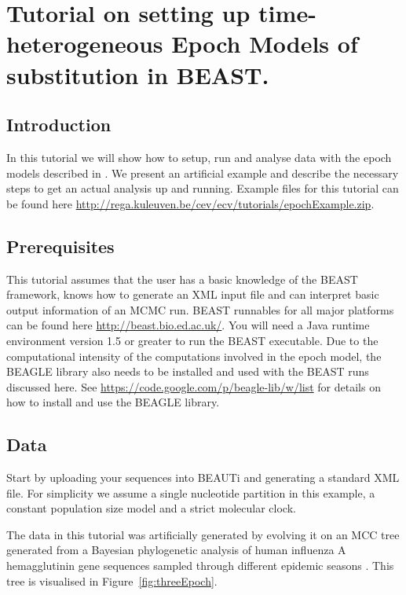 \chapter{Tutorial on setting up time-heterogeneous Epoch Models of substitution in BEAST.\label{app:epoch}}

\section{Introduction}

In this tutorial we will show how to setup, run and analyse data with the epoch models described in \cite{Bielejec2014a}.
We present an artificial example and describe the necessary steps to get an actual analysis up and running.
Example files for this tutorial can be found here \url{http://rega.kuleuven.be/cev/ecv/tutorials/epochExample.zip}.

\section{Prerequisites}

This tutorial assumes that the user has a basic knowledge of the BEAST framework, knows how to generate an XML input file and can interpret basic output information of an MCMC run.
BEAST runnables for all major platforms can be found here \url{http://beast.bio.ed.ac.uk/}.
You will need a Java runtime environment version 1.5 or greater to run the BEAST executable.
Due to the computational intensity of the computations involved in the epoch model, the BEAGLE library also needs to be installed and used with the BEAST runs discussed here.
See \url{https://code.google.com/p/beagle-lib/w/list} for details on how to install and use the BEAGLE library.

\section{Data\label{sec:first}}

Start by uploading your sequences into BEAUTi and generating a standard XML file.
For simplicity we assume a single nucleotide partition in this example, a constant population size model and a strict molecular clock.

The data in this tutorial was artificially generated by evolving it on an MCC tree generated from a Bayesian phylogenetic analysis of human influenza A hemagglutinin gene sequences sampled through different epidemic seasons \citep{Drummond2010}.
This tree is visualised in Figure~\ref{fig:threeEpoch}.

